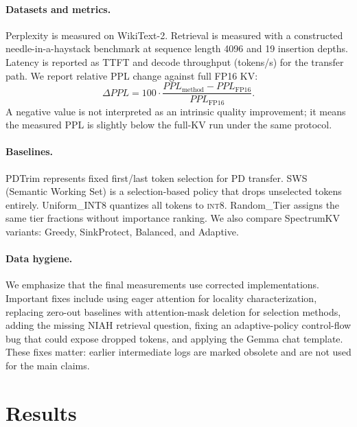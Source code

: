 \documentclass[11pt]{article}
\newcommand{\method}{SpectrumKV}
\newcommand{\ppl}{PPL}
\newcommand{\niah}{NIAH}
\newcommand{\intviii}{\textsc{int8}}
\theoremstyle{plain}
\theoremstyle{definition}
\begin{document}
\paragraph{Datasets and metrics.}
Perplexity is measured on WikiText-2.  Retrieval is measured with a constructed needle-in-a-haystack benchmark at sequence length 4096 and 19 insertion depths.  Latency is reported as TTFT and decode throughput (tokens/s) for the transfer path.  We report relative PPL change against full FP16 KV:
\begin{equation}
  \Delta \ppl = 100\cdot\frac{\ppl_{\mathrm{method}}-\ppl_{\mathrm{FP16}}}{\ppl_{\mathrm{FP16}}}.
\end{equation}
A negative value is not interpreted as an intrinsic quality improvement; it means the measured PPL is slightly below the full-KV run under the same protocol.

\paragraph{Baselines.}
PDTrim represents fixed first/last token selection for PD transfer.  SWS (Semantic Working Set) is a selection-based policy that drops unselected tokens entirely.  Uniform\_INT8 quantizes all tokens to \intviii{}.  Random\_Tier assigns the same tier fractions without importance ranking.  We also compare \method{} variants: Greedy, SinkProtect, Balanced, and Adaptive.

\paragraph{Data hygiene.}
We emphasize that the final measurements use corrected implementations.  Important fixes include using eager attention for locality characterization, replacing zero-out baselines with attention-mask deletion for selection methods, adding the missing \niah{} retrieval question, fixing an adaptive-policy control-flow bug that could expose dropped tokens, and applying the Gemma chat template.  These fixes matter: earlier intermediate logs are marked obsolete and are not used for the main claims.

\section{Results}
\label{sec:results}
\end{document}
